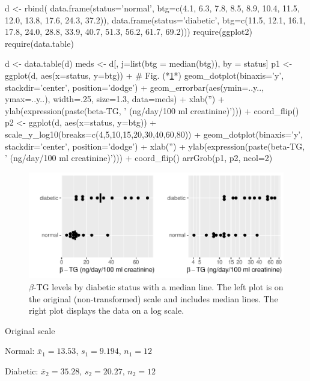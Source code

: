 \begin{Schunk}
\begin{Sinput}
d <- rbind(
  data.frame(status='normal',
             btg=c(4.1, 6.3, 7.8, 8.5, 8.9, 10.4, 11.5, 12.0, 13.8,
                   17.6, 24.3, 37.2)),
  data.frame(status='diabetic',
             btg=c(11.5, 12.1, 16.1, 17.8, 24.0, 28.8, 33.9, 40.7,
                   51.3, 56.2, 61.7, 69.2)))
require(ggplot2)
require(data.table)
\end{Sinput}
\begin{Sinput}
d <- data.table(d)
meds <- d[, j=list(btg = median(btg)), by = status]
p1 <- 
  ggplot(d, aes(x=status, y=btg)) +    # Fig. (*\ref{fig:change-diabetes}*)
  geom_dotplot(binaxis='y', stackdir='center', position='dodge') +
  geom_errorbar(aes(ymin=..y.., ymax=..y..), width=.25, size=1.3, data=meds) +
   xlab('') + ylab(expression(paste(beta-TG, ' (ng/day/100 ml creatinine)'))) + 
  coord_flip()
p2 <- ggplot(d, aes(x=status, y=btg)) +
  scale_y_log10(breaks=c(4,5,10,15,20,30,40,60,80)) +
  geom_dotplot(binaxis='y', stackdir='center', position='dodge') +
  xlab('') + ylab(expression(paste(beta-TG, ' (ng/day/100 ml creatinine)'))) +
  coord_flip()
arrGrob(p1, p2, ncol=2)
\end{Sinput}
\begin{figure}[htbp]

\centerline{\includegraphics[width=\maxwidth]{change-diabetes-1} }

\caption[$\beta$-TG levels by diabetic status]{$\beta$-TG levels by diabetic status with a median line.  The left plot is on the original (non-transformed) scale and includes median lines.  The right plot displays the data on a log scale.}\label{fig:change-diabetes}
\end{figure}
\end{Schunk}
\bi
 \item Original scale
  \bi
   \item Normal: $\overline{x}_1 = 13.53$, $s_1 = 9.194$, $n_1 = 12$
   \item Diabetic: $\overline{x}_2 = 35.28$, $s_2 = 20.27$, $n_2 = 12$
